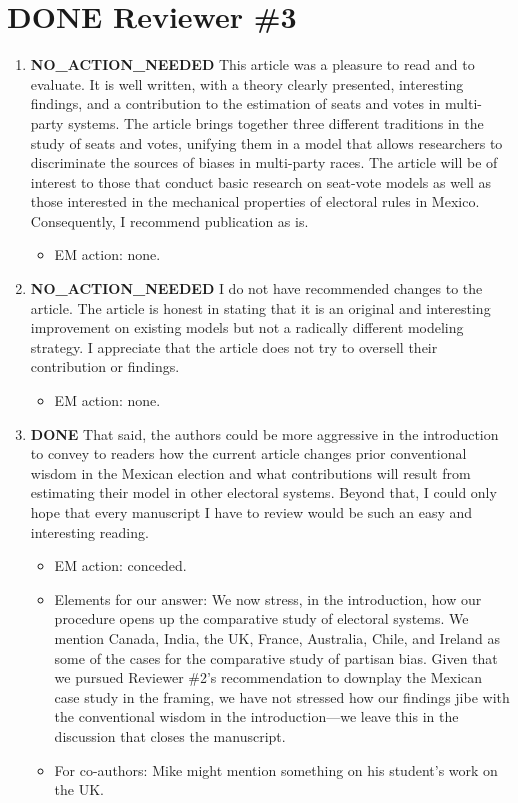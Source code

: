 \documentclass{article}
\begin{document}
\section{{\bfseries\sffamily DONE} Reviewer \#3}
\label{sec:orgheadline20}
\begin{enumerate}
\item {\bfseries\sffamily NO\_ACTION\_NEEDED} This article was a pleasure to read and to evaluate. It is well written, with a theory clearly presented, interesting findings, and a contribution to the estimation of seats and votes in multi-party systems. The article brings together three different traditions in the study of seats and votes, unifying them in a model that allows researchers to discriminate the sources of biases in multi-party races. The article will be of interest to those that conduct basic research on seat-vote models as well as those interested in the mechanical properties of electoral rules in Mexico. Consequently, I recommend publication as is.
\label{sec:orgheadline17}
\begin{itemize}
\item EM action: none.
\end{itemize}
\item {\bfseries\sffamily NO\_ACTION\_NEEDED} I do not have recommended changes to the article. The article is honest in stating that it is an original and interesting improvement on existing models but not a radically different modeling strategy. I appreciate that the article does not try to oversell their contribution or findings.
\label{sec:orgheadline18}
\begin{itemize}
\item EM action: none.
\end{itemize}
\item {\bfseries\sffamily DONE} That said, the authors could be more aggressive in the introduction to convey to readers how the current article changes prior conventional wisdom in the Mexican election and what contributions will result from estimating their model in other electoral systems. Beyond that, I could only hope that every manuscript I have to review would be such an easy and interesting reading.
\label{sec:orgheadline19}
\begin{itemize}
\item EM action: conceded.
\item Elements for our answer: We now stress, in the introduction, how our procedure opens up the comparative study of electoral systems. We mention Canada, India, the UK, France, Australia, Chile, and Ireland as some of the cases for the comparative study of partisan bias. Given that we pursued Reviewer \#2's recommendation to downplay the Mexican case study in the framing, we have not stressed how our findings jibe with the conventional wisdom in the introduction---we leave this in the discussion that closes the manuscript.
\item For co-authors: Mike might mention something on his student's work on the UK.
\end{itemize}
\end{enumerate}
\end{document}
